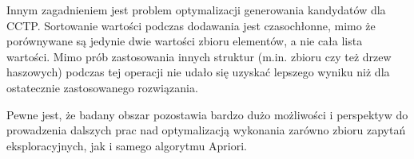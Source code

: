 Innym zagadnieniem jest problem optymalizacji generowania kandydatów dla CCTP. Sortowanie wartości podczas dodawania jest czasochłonne, mimo że porównywane są jedynie dwie wartości zbioru elementów, a nie cała lista wartości. Mimo prób zastosowania innych struktur (m.in. zbioru czy też drzew haszowych) podczas tej operacji nie udało się uzyskać lepszego wyniku niż dla ostatecznie zastosowanego rozwiązania. 

Pewne jest, że badany obszar pozostawia bardzo dużo możliwości i perspektyw do prowadzenia dalszych prac nad optymalizacją wykonania zarówno zbioru zapytań eksploracyjnych, jak i samego algorytmu Apriori. 